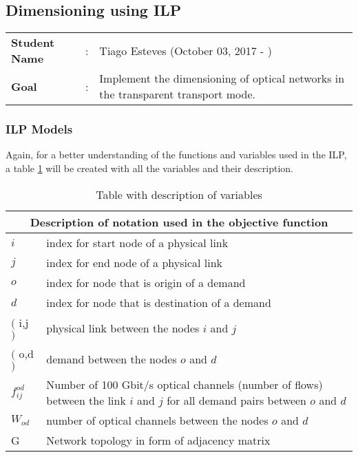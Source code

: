 \newpage
\subsection{Dimensioning using ILP}
\begin{tcolorbox}	
\begin{tabular}{p{2.75cm} p{0.2cm} p{10.5cm}} 	
\textbf{Student Name}  &:& Tiago Esteves    (October 03, 2017 - )\\
\textbf{Goal}          &:& Implement the dimensioning of optical networks in the transparent transport mode.
\end{tabular}
\end{tcolorbox}

\subsubsection{ILP Models} \label{ILP_models_Transp}

Again, for a better understanding of the functions and variables used in the ILP, a table \ref{description_transp} will be created with all the variables and their description. \\

\begin{table}[h!]
\centering
\begin{tabular}{ |p{1cm}||p{13cm}|}
 \hline
 \multicolumn{2}{|c|}{Description of notation used in the objective function} \\
 \hline
 \hline
 $i$ & index for start node of a physical link \\
 $j$ & index for end node of a physical link \\
 $o$ & index for node that is origin of a demand \\
 $d$ & index for node that is destination of a demand \\
 $($ i,j $)$ & physical link between the nodes $i$ and $j$ \\
 $($ o,d $)$ & demand between the nodes $o$ and $d$ \\
 $f_{ij}^{od}$ & Number of 100 Gbit/s optical channels (number of flows) between the link $i$ and $j$ for all demand pairs between $o$ and $d$ \\
 $W_{od}$ & number of optical channels between the nodes $o$ and $d$\\
 G & Network topology in form of adjacency matrix \\
 \hline
\end{tabular}
\caption{Table with description of variables}
\label{description_transp}
\end{table}


